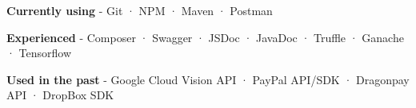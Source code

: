 \begin{cventries}
    {} %
    {} %
    {
      \begin{cvitems} %
        \item {\textbf{Currently using} \hspace{0.03cm} - \hspace{0.03cm} Git \hspace{0.03cm} · \hspace{0.03cm} NPM \hspace{0.03cm} · \hspace{0.03cm} Maven \hspace{0.03cm} · \hspace{0.03cm} Postman} %
        \item {\textbf{Experienced} \hspace{0.03cm} - \hspace{0.03cm} Composer \hspace{0.03cm} · \hspace{0.03cm} Swagger \hspace{0.03cm} · \hspace{0.03cm} JSDoc \hspace{0.03cm} · \hspace{0.03cm} JavaDoc \hspace{0.03cm} · \hspace{0.03cm} Truffle \hspace{0.03cm} · \hspace{0.03cm} Ganache \hspace{0.03cm} · \hspace{0.03cm} Tensorflow} %
        \item {\textbf{Used in the past} \hspace{0.03cm} - \hspace{0.03cm} Google Cloud Vision API \hspace{0.03cm} · \hspace{0.03cm} PayPal API/SDK \hspace{0.03cm} · \hspace{0.03cm} Dragonpay API \hspace{0.03cm} · \hspace{0.03cm} DropBox SDK \\} %
      \end{cvitems}
    }

\end{cventries}